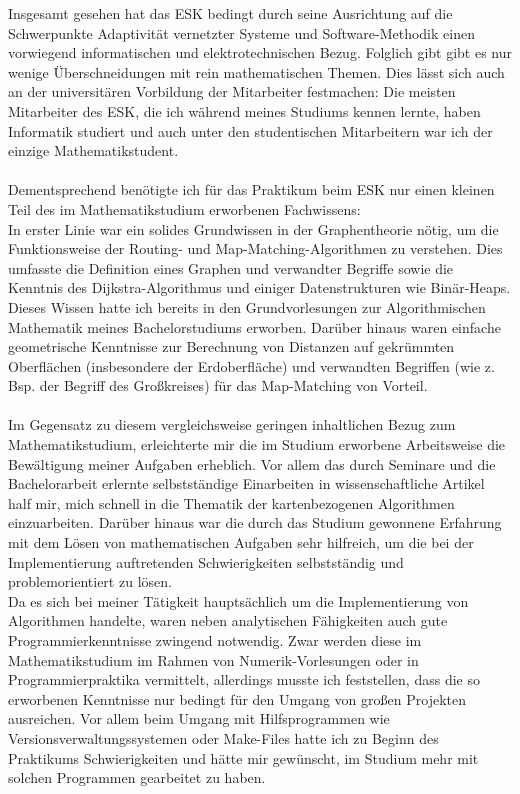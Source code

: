 \documentclass[a4paper]{scrartcl}
\begin{document}
Insgesamt gesehen hat das ESK bedingt durch seine Ausrichtung auf die Schwerpunkte Adaptivität vernetzter Systeme und Software-Methodik einen vorwiegend informatischen und elektrotechnischen Bezug. Folglich gibt gibt es nur wenige Überschneidungen mit rein mathematischen Themen. Dies lässt sich auch an der universitären Vorbildung der Mitarbeiter festmachen: Die meisten Mitarbeiter des ESK, die ich während meines Studiums kennen lernte, haben Informatik studiert und auch unter den studentischen Mitarbeitern 
war ich der einzige Mathematikstudent. 
\\\\
Dementsprechend benötigte ich für das Praktikum beim ESK nur einen kleinen Teil des im Mathematikstudium erworbenen Fachwissens: \\
In erster Linie war ein solides Grundwissen in der Graphentheorie nötig, um die Funktionsweise der Routing- und Map-Matching-Algorithmen zu verstehen. Dies umfasste die Definition eines Graphen und verwandter Begriffe sowie die Kenntnis des Dijkstra-Algorithmus und einiger Datenstrukturen wie Binär-Heaps. Dieses Wissen hatte ich bereits in den Grundvorlesungen zur Algorithmischen Mathematik meines Bachelorstudiums erworben. Darüber hinaus waren einfache geometrische Kenntnisse zur Berechnung von Distanzen auf gekrümmten Oberflächen (insbesondere der Erdoberfläche) und verwandten Begriffen (wie z. Bsp. der Begriff des Großkreises) für das Map-Matching von Vorteil. 
\\\\
Im Gegensatz zu diesem vergleichsweise geringen inhaltlichen Bezug zum Mathematikstudium, erleichterte mir die im Studium erworbene Arbeitsweise die Bewältigung meiner Aufgaben erheblich. Vor allem das durch Seminare und die Bachelorarbeit erlernte selbstständige Einarbeiten in wissenschaftliche Artikel half mir, mich schnell in die Thematik der kartenbezogenen Algorithmen einzuarbeiten. Darüber hinaus war die durch das Studium gewonnene Erfahrung mit dem Lösen von mathematischen Aufgaben sehr hilfreich, um die bei der Implementierung auftretenden Schwierigkeiten selbstständig und problemorientiert zu lösen.  \\
Da es sich bei meiner Tätigkeit hauptsächlich um die Implementierung von Algorithmen handelte, waren neben analytischen Fähigkeiten auch gute Programmierkenntnisse zwingend notwendig. Zwar werden diese im Mathematikstudium im Rahmen von Numerik-Vorlesungen oder in Programmierpraktika vermittelt, allerdings musste ich feststellen, dass die so erworbenen Kenntnisse nur bedingt für den Umgang von großen Projekten ausreichen. Vor allem beim Umgang mit Hilfsprogrammen wie Versionsverwaltungssystemen oder Make-Files hatte ich zu Beginn des Praktikums Schwierigkeiten und hätte mir gewünscht, im Studium mehr mit solchen Programmen gearbeitet zu haben. 
\end{document}
